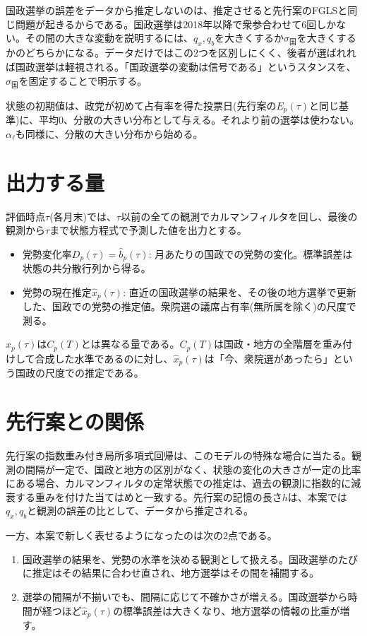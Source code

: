\documentclass[a4paper,11pt]{ltjsarticle}
\begin{document}
国政選挙の誤差をデータから推定しないのは、推定させると先行案のFGLSと同じ問題が起きるからである。国政選挙は2018年以降で衆参合わせて6回しかない。その間の大きな変動を説明するには、$q_x,q_b$を大きくするか$\sigma_{\text{国}}$を大きくするかのどちらかになる。データだけではこの2つを区別しにくく、後者が選ばれれば国政選挙は軽視される。「国政選挙の変動は信号である」というスタンスを、$\sigma_{\text{国}}$を固定することで明示する。

状態の初期値は、政党が初めて占有率を得た投票日(先行案の$E_p(\tau)$と同じ基準)に、平均0、分散の大きい分布として与える。それより前の選挙は使わない。$\alpha_\ell$も同様に、分散の大きい分布から始める。

\section{出力する量}
\label{sec:output}

評価時点$\tau$(各月末)では、$\tau$以前の全ての観測でカルマンフィルタを回し、最後の観測から$\tau$まで状態方程式で予測した値を出力とする。

\begin{itemize}
  \item 党勢変化率$D_p(\tau)=\hat b_p(\tau)$: 月あたりの国政での党勢の変化。標準誤差は状態の共分散行列から得る。
  \item 党勢の現在推定$\hat x_p(\tau)$: 直近の国政選挙の結果を、その後の地方選挙で更新した、国政での党勢の推定値。衆院選の議席占有率(無所属を除く)の尺度で測る。
\end{itemize}

$\hat x_p(\tau)$は$C_p(T)$とは異なる量である。$C_p(T)$は国政・地方の全階層を重み付けして合成した水準であるのに対し、$\hat x_p(\tau)$は「今、衆院選があったら」という国政の尺度での推定である。

\section{先行案との関係}
\label{sec:relation}

先行案の指数重み付き局所多項式回帰は、このモデルの特殊な場合に当たる。観測の間隔が一定で、国政と地方の区別がなく、状態の変化の大きさが一定の比率にある場合、カルマンフィルタの定常状態での推定は、過去の観測に指数的に減衰する重みを付けた当てはめと一致する。先行案の記憶の長さ$h$は、本案では$q_x,q_b$と観測の誤差の比として、データから推定される。

一方、本案で新しく表せるようになったのは次の2点である。

\begin{enumerate}
  \item 国政選挙の結果を、党勢の水準を決める観測として扱える。国政選挙のたびに推定はその結果に合わせ直され、地方選挙はその間を補間する。
  \item 選挙の間隔が不揃いでも、間隔に応じて不確かさが増える。国政選挙から時間が経つほど$\hat x_p(\tau)$の標準誤差は大きくなり、地方選挙の情報の比重が増す。
\end{enumerate}
\end{document}
